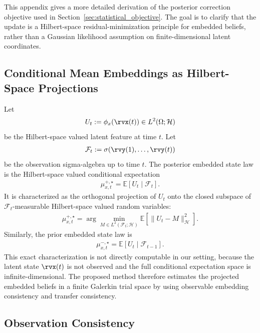 \documentclass[twoside,11pt]{article}
\begin{document}
This appendix gives a more detailed derivation of the posterior
correction objective used in Section~\ref{sec:statistical_objective}.
The goal is to clarify that the update is a Hilbert-space
residual-minimization principle for embedded beliefs, rather than a
Gaussian likelihood assumption on finite-dimensional latent
coordinates.

\subsection{Conditional Mean Embeddings as Hilbert-Space Projections}

Let
\begin{align}
U_t
:=
\phi_x(\rvx(t))
\in
L^2(\Omega;\mathcal H)
\end{align}
be the Hilbert-space valued latent feature at time $t$. Let
\begin{align}
\mathcal F_t
:=
\sigma(\rvy(1),\dots,\rvy(t))
\end{align}
be the observation sigma-algebra up to time $t$. The posterior embedded
state law is the Hilbert-space valued conditional expectation
\begin{align}
\mu_{x,t}^{+,\star}
=
\mathbb E[
U_t
\mid
\mathcal F_t
].
\end{align}
It is characterized as the orthogonal projection of $U_t$ onto the
closed subspace of $\mathcal F_t$-measurable Hilbert-space valued random
variables:
\begin{align}
\mu_{x,t}^{+,\star}
=
\arg\min_{M\in L^2(\mathcal F_t;\mathcal H)}
\mathbb E
\left[
\|U_t-M\|_{\mathcal H}^2
\right].
\label{eq:app_conditional_expectation_projection}
\end{align}
Similarly, the prior embedded state law is
\begin{align}
\mu_{x,t}^{-,\star}
=
\mathbb E[
U_t
\mid
\mathcal F_{t-1}
].
\end{align}
This exact characterization is not directly computable in our setting,
because the latent state $\rvx(t)$ is not observed and the full
conditional expectation space is infinite-dimensional. The proposed
method therefore estimates the projected embedded beliefs in a finite
Galerkin trial space by using observable embedding consistency and
transfer consistency.

\subsection{Observation Consistency}
\end{document}
